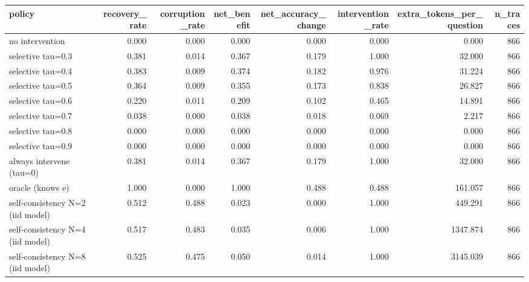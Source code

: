 \begin{tabular}{lrrrrrrr}
\toprule
policy & recovery_rate & corruption_rate & net_benefit & net_accuracy_change & intervention_rate & extra_tokens_per_question & n_traces \\
\midrule
no intervention & 0.000 & 0.000 & 0.000 & 0.000 & 0.000 & 0.000 & 866 \\
selective tau=0.3 & 0.381 & 0.014 & 0.367 & 0.179 & 1.000 & 32.000 & 866 \\
selective tau=0.4 & 0.383 & 0.009 & 0.374 & 0.182 & 0.976 & 31.224 & 866 \\
selective tau=0.5 & 0.364 & 0.009 & 0.355 & 0.173 & 0.838 & 26.827 & 866 \\
selective tau=0.6 & 0.220 & 0.011 & 0.209 & 0.102 & 0.465 & 14.891 & 866 \\
selective tau=0.7 & 0.038 & 0.000 & 0.038 & 0.018 & 0.069 & 2.217 & 866 \\
selective tau=0.8 & 0.000 & 0.000 & 0.000 & 0.000 & 0.000 & 0.000 & 866 \\
selective tau=0.9 & 0.000 & 0.000 & 0.000 & 0.000 & 0.000 & 0.000 & 866 \\
always intervene (tau=0) & 0.381 & 0.014 & 0.367 & 0.179 & 1.000 & 32.000 & 866 \\
oracle (knows e) & 1.000 & 0.000 & 1.000 & 0.488 & 0.488 & 161.057 & 866 \\
self-consistency N=2 (iid model) & 0.512 & 0.488 & 0.023 & 0.000 & 1.000 & 449.291 & 866 \\
self-consistency N=4 (iid model) & 0.517 & 0.483 & 0.035 & 0.006 & 1.000 & 1347.874 & 866 \\
self-consistency N=8 (iid model) & 0.525 & 0.475 & 0.050 & 0.014 & 1.000 & 3145.039 & 866 \\
\bottomrule
\end{tabular}
